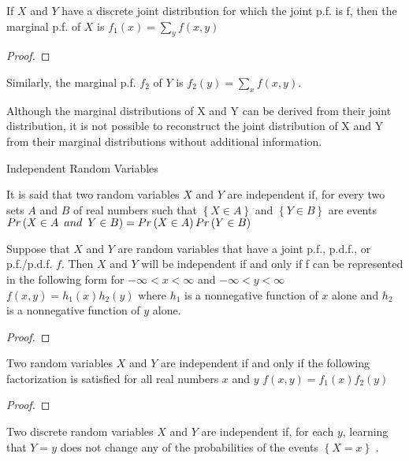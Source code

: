 \begin{proposition}
If $X$ and $Y$ have a discrete joint distribution for which the joint p.f. is f, then the marginal p.f. of $X$ is $f_{1}\left(x\right)=\sum_{y}f\left(x,y\right)$
\end{proposition}
\begin{proof}
\end{proof}

{\color{red} Similarly, the marginal p.f. $f_{2}$ of $Y$ is $f_{2} \left(y\right)=\sum_{x}f\left(x,y\right)$.}

{\color{red} Although the marginal distributions of X and Y can be derived from their joint distribution, it is not possible to reconstruct the joint distribution of X and Y from their marginal distributions without additional information.}

{\color{red} Independent Random Variables}

\begin{definition}
It is said that two random variables $X$ and $Y$ are independent if, for every two sets $A$ and $B$ of real numbers such that $\left\{ X\in A\right\}$ and $\left\{ Y\in B\right\}$ are events $Pr\left(X\in A\enskip and\enskip Y\in B\right)=Pr\left(X\in A\right)Pr\left(Y\in B\right)$
\end{definition}

\begin{proposition}
Suppose that $X$ and $Y$ are random variables that have a joint p.f., p.d.f., or p.f./p.d.f. $f$. Then $X$ and $Y$ will be independent if and only if f can be represented in the following form for $-\infty<x<\infty$ and $-\infty<y<\infty$ $f\left(x,y\right)=h_{1}\left(x\right)h_{2}\left(y\right)$ where $h_{1}$ is a nonnegative function of $x$ alone and $h_{2}$ is a nonnegative function of $y$ alone.
\end{proposition}
\begin{proof}
\end{proof}

\begin{corollary}
Two random variables $X$ and $Y$ are independent if and only if the following factorization is satisfied for all real numbers $x$ and $y$ $f\left(x,y\right)=f_{1}\left(x\right)f_{2}\left(y\right)$
\end{corollary}
\begin{proof}
\end{proof}

{\color{red} Two discrete random variables $X$ and $Y$ are independent if, for each $y$, learning that $Y=y$ does not change any of the probabilities of the events $\left\{ X=x\right\}$ .}

